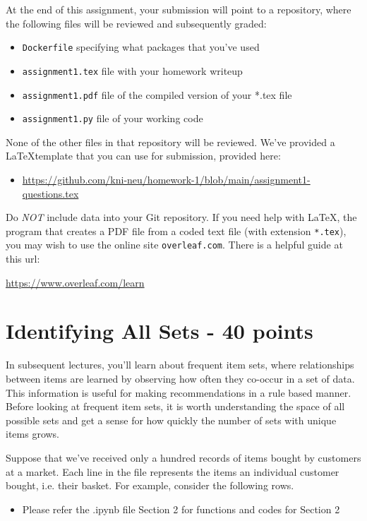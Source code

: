 \documentclass[paper=a4, fontsize=11pt]{scrartcl} %
\begin{document}
At the end of this assignment, your submission will point to a repository, where the following files will be reviewed and subsequently graded:

\begin{itemize}
    \item \verb"Dockerfile" specifying what packages that you've used
    \item \verb"assignment1.tex" file with your homework writeup
    \item \verb"assignment1.pdf" file of the compiled version of your *.tex file
    \item \verb"assignment1.py" file of your working code
\end{itemize}

None of the other files in that repository will be reviewed. We've provided a \LaTeX template that you can use for submission, provided here:
\begin{itemize}
    \item \url{https://github.com/kni-neu/homework-1/blob/main/assignment1-questions.tex}
\end{itemize}

Do \emph{NOT} include data into your Git repository. If you need help with \LaTeX, the program that creates a PDF file from a coded text file (with extension \verb"*.tex"), you may wish to use the online site \verb"overleaf.com". There is a helpful guide at this url:

\url{https://www.overleaf.com/learn}

\section{Identifying All Sets - 40 points}

In subsequent lectures, you'll learn about frequent item sets, where relationships between items are learned by observing how often they co-occur in a set of data. This information is useful for making recommendations in a rule based manner. Before looking at frequent item sets, it is worth understanding the space of all possible sets and get a sense for how quickly the number of sets with unique items grows.

Suppose that we've received only a hundred records of items bought by customers at a market. Each line in the file represents the items an individual customer bought, i.e. their basket. For example, consider the following rows.

\begin{itemize}
\color{red}
    \item Please refer the .ipynb file Section 2 for functions and codes for Section 2
\end{itemize}
\end{document}
